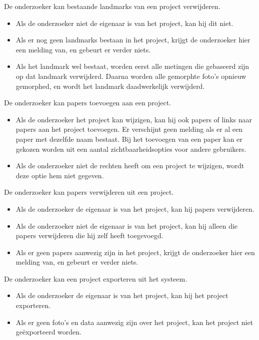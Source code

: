 \noindent
De onderzoeker kan bestaande landmarks van een project verwijderen.
\begin{itemize}
	\item Als de onderzoeker niet de eigenaar is van het project, kan hij dit niet.
	\item Als er nog geen landmarks bestaan in het project, krijgt de onderzoeker hier een melding van, en gebeurt er verder niets.
	\item Als het landmark wel bestaat, worden eerst alle metingen die gebaseerd zijn op dat landmark verwijderd. Daarna worden alle gemorphte foto's opnieuw gemorphed, en wordt het landmark daadwerkelijk verwijderd.
\end{itemize}

\noindent
De onderzoeker kan papers toevoegen aan een project.
\begin{itemize}
	\item Als de onderzoeker het project kan wijzigen, kan hij ook papers of links naar papers aan het project toevoegen. Er verschijnt geen melding als er al een paper met dezelfde naam bestaat. Bij het toevoegen van een paper kan er gekozen worden uit een aantal zichtbaarheidsopties voor andere gebruikers.
	\item Als de onderzoeker niet de rechten heeft om een project te wijzigen, wordt deze optie hem niet gegeven.
\end{itemize}

\noindent
De onderzoeker kan papers verwijderen uit een project.
\begin{itemize}
	\item Als de onderzoeker de eigenaar is van het project, kan hij papers verwijderen.
	\item Als de onderzoeker niet de eigenaar is van het project, kan hij alleen die papers verwijderen die hij zelf heeft toegevoegd.
	\item Als er geen papers aanwezig zijn in het project, krijgt de onderzoeker hier een melding van, en gebeurt er verder niets.
\end{itemize}

\noindent
De onderzoeker kan een project exporteren uit het systeem.
\begin{itemize}
	\item Als de onderzoeker de eigenaar is van het project, kan hij het project exporteren.
	\item Als er geen foto's en data aanwezig zijn over het project, kan het project niet ge\"exporteerd worden.
\end{itemize}

